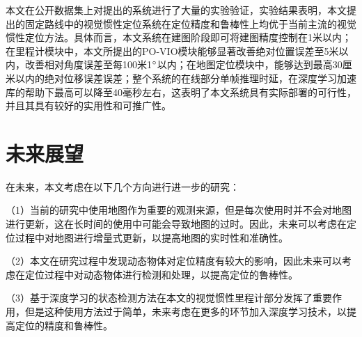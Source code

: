本文在公开数据集上对提出的系统进行了大量的实验验证，实验结果表明，本文提出的固定路线中的视觉惯性定位系统在定位精度和鲁棒性上均优于当前主流的视觉惯性定位方法。具体而言，本文系统在建图阶段即可将建图精度控制在1米以内；在里程计模块中，本文所提出的PO-VIO模块能够显著改善绝对位置误差至5米以内，改善相对角度误差至每100米1$\degree$以内；在地图定位模块中，能够达到最高30厘米以内的绝对位移误差误差；整个系统的在线部分单帧推理时延，在深度学习加速库的帮助下最高可以降至40毫秒左右，这表明了本文系统具有实际部署的可行性，并且其具有较好的实用性和可推广性。

\section{未来展望}

在未来，本文考虑在以下几个方向进行进一步的研究：

（1）当前的研究中使用地图作为重要的观测来源，但是每次使用时并不会对地图进行更新，这在长时间的使用中可能会导致地图的过时。因此，未来可以考虑在定位过程中对地图进行增量式更新，以提高地图的实时性和准确性。

（2）本文在研究过程中发现动态物体对定位精度有较大的影响，因此未来可以考虑在定位过程中对动态物体进行检测和处理，以提高定位的鲁棒性。

（3）基于深度学习的状态检测方法在本文的视觉惯性里程计部分发挥了重要作用，但是这种使用方法过于简单，未来考虑在更多的环节加入深度学习技术，以提高定位的精度和鲁棒性。